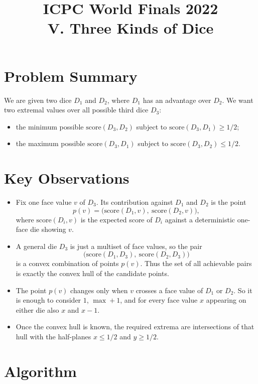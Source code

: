 \documentclass[11pt]{article}
\title{ICPC World Finals 2022\\V. Three Kinds of Dice}
\author{}
\date{}
\begin{document}
\maketitle

\section*{Problem Summary}

We are given two dice $D_1$ and $D_2$, where $D_1$ has an advantage over $D_2$. We want two extremal
values over all possible third dice $D_3$:
\begin{itemize}[leftmargin=*]
    \item the minimum possible $\text{score}(D_3,D_2)$ subject to $\text{score}(D_3,D_1)\ge 1/2$;
    \item the maximum possible $\text{score}(D_3,D_1)$ subject to $\text{score}(D_3,D_2)\le 1/2$.
\end{itemize}

\section*{Key Observations}

\begin{itemize}[leftmargin=*]
    \item Fix one face value $v$ of $D_3$. Its contribution against $D_1$ and $D_2$ is the point
    \[
    p(v)=\bigl(\text{score}(D_1,v),\ \text{score}(D_2,v)\bigr),
    \]
    where $\text{score}(D_i,v)$ is the expected score of $D_i$ against a deterministic one-face die
    showing $v$.
    \item A general die $D_3$ is just a multiset of face values, so the pair
    \[
    \bigl(\text{score}(D_1,D_3),\ \text{score}(D_2,D_3)\bigr)
    \]
    is a convex combination of points $p(v)$. Thus the set of all achievable pairs is exactly the convex
    hull of the candidate points.
    \item The point $p(v)$ changes only when $v$ crosses a face value of $D_1$ or $D_2$. So it is enough
    to consider $1$, $\max+1$, and for every face value $x$ appearing on either die also $x$ and $x-1$.
    \item Once the convex hull is known, the required extrema are intersections of that hull with the
    half-planes $x \le 1/2$ and $y \ge 1/2$.
\end{itemize}

\section*{Algorithm}
\end{document}
